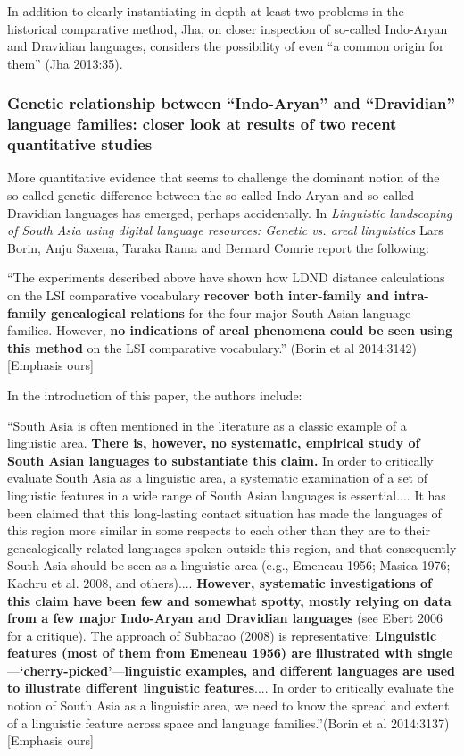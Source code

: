 In addition to clearly instantiating in depth at least two problems in the historical comparative method, Jha, on closer inspection of so-called Indo-Aryan and Dravidian languages, considers the possibility of even “a common origin for them” (Jha 2013:35).


\subsubsection{Genetic relationship between “Indo-Aryan” and “Dravidian” language families: closer look at results of two recent quantitative studies}

More quantitative evidence that seems to challenge the dominant notion of the so-called genetic difference between the so-called Indo-Aryan and so-called Dravidian languages has emerged, perhaps accidentally. In \textit{Linguistic landscaping of South Asia using digital language resources: Genetic vs. areal linguistics} Lars Borin, Anju Saxena, Taraka Rama and Bernard Comrie report the following:

\begin{myquote}
“The experiments described above have shown how LDND distance calculations on the LSI comparative vocabulary \textbf{recover both inter-family and intra-family genealogical relations} for the four major South Asian language families. However,\textbf{ no indications of areal phenomena could be seen using this method} on the LSI comparative vocabulary.” \hfill (Borin et al 2014:3142)[Emphasis ours]
\end{myquote}

In the introduction of this paper, the authors include:

\begin{myquote}
“South Asia is often mentioned in the literature as a classic example of a linguistic area. \textbf{There is, however, no systematic, empirical study of South Asian languages to substantiate this claim.} In order to critically evaluate South Asia as a linguistic area, a systematic examination of a set of linguistic features in a wide range of South Asian languages is essential.... It has been claimed that this long-lasting contact situation has made the languages of this region more similar in some respects to each other than they are to their genealogically related languages spoken outside this region, and that consequently South Asia should be seen as a linguistic area (e.g., Emeneau 1956; Masica 1976; Kachru et al. 2008, and others).... \textbf{However, systematic investigations of this claim have been few and somewhat spotty, mostly relying on data from a few major Indo-Aryan and Dravidian languages} (see Ebert 2006 for a critique). The approach of Subbarao (2008) is representative: \textbf{Linguistic features (most of them from Emeneau 1956) are illustrated with single}—\textbf{‘cherry-picked’}—\textbf{linguistic examples, and different languages are used to illustrate different linguistic features}.... In order to critically evaluate the notion of South Asia as a linguistic area, we need to know the spread and extent of a linguistic feature across space and language families.”\hfill (Borin et al 2014:3137) [Emphasis ours]
\end{myquote}

